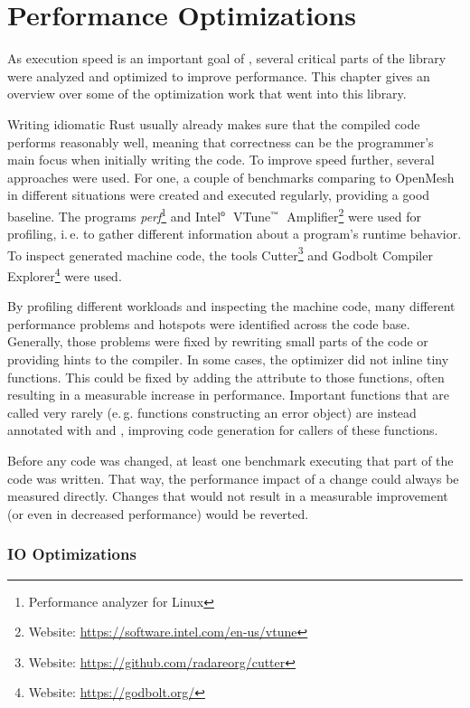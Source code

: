 \section{Performance Optimizations}

As execution speed is an important goal of , several critical parts of the library were analyzed and optimized to improve performance.
This chapter gives an overview over some of the optimization work that went into this library.

Writing idiomatic Rust usually already makes sure that the compiled code performs reasonably well, meaning that correctness can be the programmer's main focus when initially writing the code.
To improve speed further, several approaches were used.
For one, a couple of benchmarks comparing  to OpenMesh in different situations were created and executed regularly, providing a good baseline.
The programs \emph{perf}\footnote{Performance analyzer for Linux} and Intel$^\text{\tiny ®}$~VTune$^\text{\tiny ™}$~Amplifier\footnote{Website: \url{https://software.intel.com/en-us/vtune}} were used for profiling, i.\,e. to gather different information about a program's runtime behavior.
To inspect generated machine code, the tools Cutter\footnote{Website: \url{https://github.com/radareorg/cutter}} and Godbolt Compiler Explorer\footnote{Website: \url{https://godbolt.org/}} were used.

By profiling different workloads and inspecting the machine code, many different performance problems and hotspots were identified across the code base.
Generally, those problems were fixed by rewriting small parts of the code or providing hints to the compiler.
In some cases, the optimizer did not inline tiny functions.
This could be fixed by adding the  attribute to those functions, often resulting in a measurable increase in performance.
Important functions that are called very rarely (e.\,g. functions constructing an error object) are instead annotated with  and \code{#[cold]}, improving code generation for callers of these functions.

Before any code was changed, at least one benchmark executing that part of the code was written.
That way, the performance impact of a change could always be measured directly.
Changes that would not result in a measurable improvement (or even in decreased performance) would be reverted.

\vspace{-1mm}
\subsubsection*{IO Optimizations}

